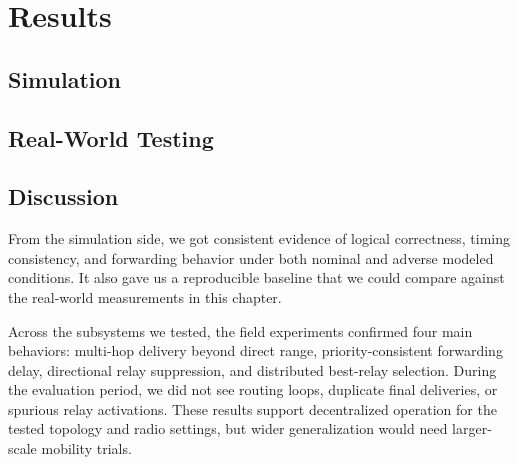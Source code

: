 \chapter{Results}

\section{Simulation}


\section{Real-World Testing}


\section{Discussion}
From the simulation side, we got consistent evidence of logical correctness, timing consistency, and
forwarding behavior under both nominal and adverse modeled conditions. It also gave us a reproducible baseline
that we could compare against the real-world measurements in this chapter.

Across the subsystems we tested, the field experiments confirmed four main behaviors: multi-hop delivery beyond
direct range, priority-consistent forwarding delay, directional relay suppression, and distributed best-relay
selection. During the evaluation period, we did not see routing loops, duplicate final deliveries, or spurious
relay activations. These results support decentralized operation for the tested topology and radio settings,
but wider generalization would need larger-scale mobility trials.